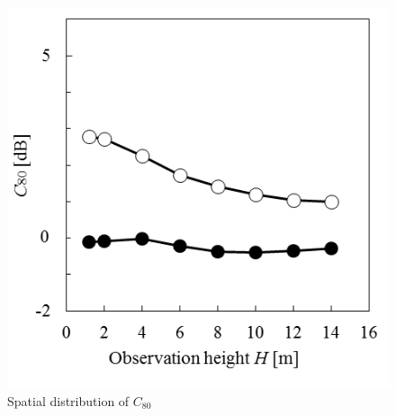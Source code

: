 \begin{figure}[htbp]
    \centering
    \includegraphics[keepaspectratio,scale=1]{04_att/C.png}
    \caption{\hspace{1mm}Spatial distribution of $C_{80}$}
    \label{fig:C}
\end{figure}
